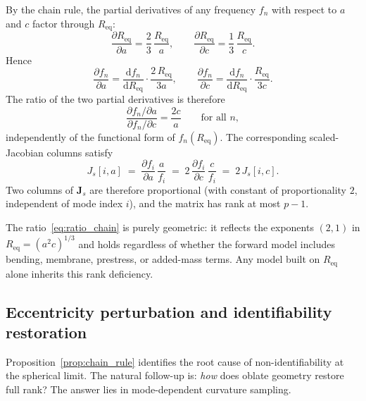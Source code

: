 \begin{pf}
By the chain rule, the partial derivatives of any frequency $f_n$ with respect
to $a$ and $c$ factor through $R_\mathrm{eq}$:
\begin{equation}\label{eq:dreq_da}
  \frac{\partial R_\mathrm{eq}}{\partial a}
  = \frac{2}{3}\,\frac{R_\mathrm{eq}}{a},
  \qquad
  \frac{\partial R_\mathrm{eq}}{\partial c}
  = \frac{1}{3}\,\frac{R_\mathrm{eq}}{c}.
\end{equation}
Hence
\begin{equation}\label{eq:dfn_chain}
  \frac{\partial f_n}{\partial a}
  = \frac{\mathrm{d} f_n}{\mathrm{d} R_\mathrm{eq}}
    \cdot \frac{2\,R_\mathrm{eq}}{3a},
  \qquad
  \frac{\partial f_n}{\partial c}
  = \frac{\mathrm{d} f_n}{\mathrm{d} R_\mathrm{eq}}
    \cdot \frac{R_\mathrm{eq}}{3c}.
\end{equation}
The ratio of the two partial derivatives is therefore
\begin{equation}\label{eq:ratio_chain}
  \frac{\partial f_n / \partial a}
       {\partial f_n / \partial c}
  = \frac{2c}{a}
  \qquad \text{for all } n,
\end{equation}
independently of the functional form of $f_n(R_\mathrm{eq})$.  The
corresponding scaled-Jacobian columns satisfy
\begin{equation}
  J_s[i,a] \;=\; \frac{\partial f_i}{\partial a}\,\frac{a}{f_i}
  \;=\; 2\,\frac{\partial f_i}{\partial c}\,\frac{c}{f_i}
  \;=\; 2\,J_s[i,c].
\end{equation}
Two columns of $\mathbf{J}_s$ are therefore proportional (with constant of
proportionality $2$, independent of mode index $i$), and the matrix has rank at
most $p-1$.
\end{pf}

\begin{remark}
The ratio~\eqref{eq:ratio_chain} is purely geometric: it reflects the exponents
$(2,1)$ in $R_\mathrm{eq} = (a^2 c)^{1/3}$ and holds regardless of whether the
forward model includes bending, membrane, prestress, or added-mass terms.  Any
model built on $R_\mathrm{eq}$ alone inherits this rank deficiency.
\end{remark}

\subsection{Eccentricity perturbation and identifiability restoration}\label{sec:perturbation}

Proposition~\ref{prop:chain_rule} identifies the root cause of
non-identifiability at the spherical limit.  The natural follow-up is:
\emph{how} does oblate geometry restore full rank?  The answer lies in
mode-dependent curvature sampling.

